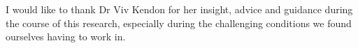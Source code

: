\begin{acknowledgements}
    I would like to thank Dr Viv Kendon for her insight, advice and guidance during the course of this research, especially during the challenging conditions we found ourselves having to work in.
\end{acknowledgements}